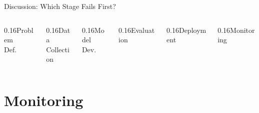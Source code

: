 \documentclass[aspectratio=169, 12pt]{beamer}
\begin{document}
\begin{frame}{Discussion: Which Stage Fails First?}
\vspace{0.4cm}
\begin{columns}[c]
  \begin{column}{0.16\textwidth}\centering\small Problem\\ Def.\end{column}
  \begin{column}{0.16\textwidth}\centering\small Data\\ Collection\end{column}
  \begin{column}{0.16\textwidth}\centering\small Model\\ Dev.\end{column}
  \begin{column}{0.16\textwidth}\centering\small Evaluation\end{column}
  \begin{column}{0.16\textwidth}\centering\small Deployment\end{column}
  \begin{column}{0.16\textwidth}\centering\small \textcolor{errorstroke}{Monitoring}\end{column}
\end{columns}

\end{frame}

\section{Monitoring}
\end{document}
